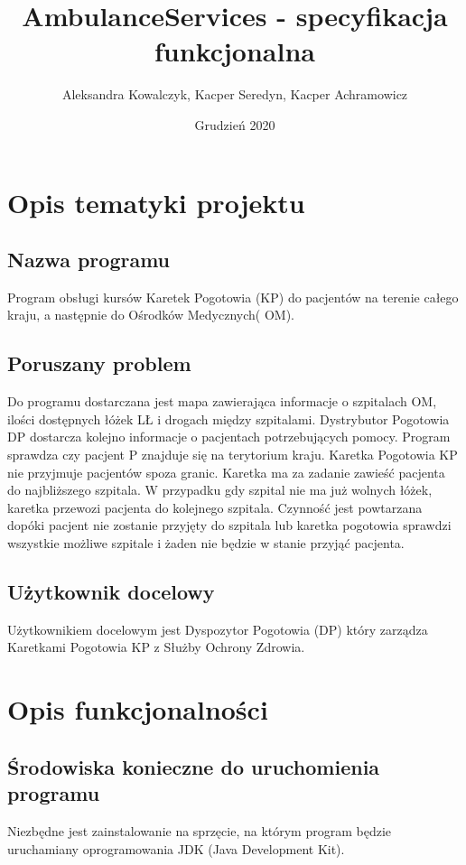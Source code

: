 \documentclass{article}
\title{AmbulanceServices - specyfikacja funkcjonalna}
\author{Aleksandra Kowalczyk, Kacper Seredyn, Kacper Achramowicz}
\date{Grudzień 2020}
\begin{document}
\maketitle
\thispagestyle{fancy}

\section{Opis tematyki projektu}

\subsection{Nazwa programu}
Program obsługi kursów Karetek Pogotowia (KP) do pacjentów na terenie całego kraju, a następnie do Ośrodków Medycznych( OM).


\subsection{Poruszany problem}
Do programu dostarczana jest mapa zawierająca informacje o szpitalach OM, ilości dostępnych łóżek LŁ i drogach między szpitalami. Dystrybutor Pogotowia DP dostarcza kolejno informacje o pacjentach potrzebujących pomocy. Program sprawdza czy pacjent P znajduje się na terytorium kraju. Karetka Pogotowia KP nie przyjmuje pacjentów spoza granic. Karetka ma za zadanie zawieść pacjenta do najbliższego szpitala. W przypadku gdy szpital nie ma już wolnych łóżek, karetka przewozi pacjenta do kolejnego szpitala. Czynność jest powtarzana dopóki pacjent nie zostanie przyjęty do szpitala lub karetka pogotowia sprawdzi wszystkie możliwe szpitale i żaden nie będzie w stanie przyjąć pacjenta.


\subsection{Użytkownik docelowy}
Użytkownikiem docelowym jest Dyspozytor Pogotowia (DP) który zarządza Karetkami Pogotowia KP z Służby Ochrony Zdrowia. 

\section{Opis funkcjonalności}

\subsection{Środowiska konieczne do uruchomienia programu}
Niezbędne jest zainstalowanie na sprzęcie, na którym program będzie uruchamiany oprogramowania JDK (Java Development Kit).
\end{document}
